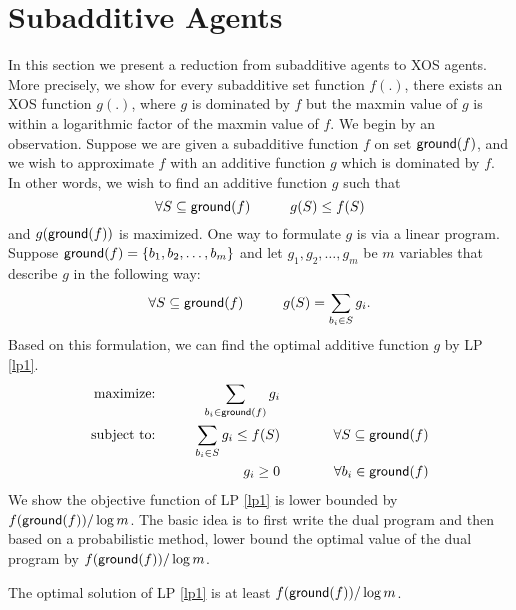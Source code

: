 \section{Subadditive Agents}\label{subadditive}
In this section we present a reduction from subadditive agents to XOS agents. More precisely, we show for every subadditive set function $f(.)$, there exists an XOS function $g(.)$, where $g$ is dominated by $f$ but the maxmin value of $g$ is within a logarithmic factor of the maxmin value of $f$. We begin by an observation. Suppose we are given a subadditive function $f$ on set $\mathsf{ground}(f)$, and we wish to approximate $f$ with an additive function $g$ which is dominated by $f$. In other words, we wish to find an additive function $g$ such that 
$$\forall S \subseteq \mathsf{ground}(f) \hspace{1cm} g(S) \leq f(S)$$
and $g(\mathsf{ground}(f))$ is maximized. One way to formulate $g$ is via a linear program. Suppose $\mathsf{ground}(f)=\{b_1,b_2,\ldots,b_m\}$ and let $g_1, g_2, \ldots, g_m$ be $m$ variables that describe $g$ in the following way:
$$\forall S \subseteq \mathsf{ground}(f) \hspace{1cm} g(S) = \sum_{b_i \in S} g_i.$$
Based on this formulation, we can find the optimal additive function $g$ by LP \ref{lp1}.
\begin{alignat}{3}\label{lp1}
\text{maximize: }& \hspace{0.5cm} &  \sum_{b_i \in \mathsf{ground}(f)}g_i & &\\
\text{subject to: }& & \sum_{b_i \in S}g_i \leq f(S) & \hspace{1cm}&\forall S \subseteq \mathsf{ground}(f)\nonumber\\
& & g_i \geq 0 & &\forall b_i \in \mathsf{ground}(f)\nonumber
\end{alignat}
We show the objective function of LP \ref{lp1} is lower bounded by $f(\mathsf{ground}(f)) / \log m$. The basic idea is to first write the dual program and then based on a probabilistic method, lower bound the optimal value of the dual program by $f(\mathsf{ground}(f))/ \log m$. 
\begin{lemma}\label{jj1}
	The optimal solution of LP \ref{lp1} is at least $f(\mathsf{ground}(f))/ \log m$.
\end{lemma}
